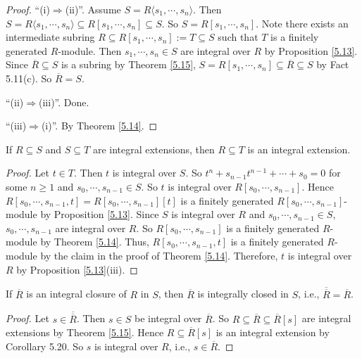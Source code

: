 \begin{proof}
    ``(i)$\Rightarrow$(ii)''. Assume $S = R\langle s_1,\cdots,s_n \rangle$. Then $S = R\langle s_1,\cdots,s_n \rangle \subseteq R[s_1,\cdots,s_n] \subseteq S$. So $S = R[s_1,\cdots,s_n]$. Note there exists an intermediate subring $R \subseteq R[s_1,\cdots,s_n] := T \subseteq S$ such that $T$ is a finitely generated $R$-module. Then $s_1,\cdots,s_n \in S$ are integral over $R$ by Proposition \ref{5.13}. Since $\overbar{R} \subseteq S$ is a subring by Theorem \ref{5.15}, $S = R[s_1,\cdots,s_n] \subseteq \overbar{R} \subseteq S$ by Fact 5.11(c). So $\overbar{R} = S$. \par
    ``(ii)$\Rightarrow$(iii)''. Done. \par 
    ``(iii)$\Rightarrow$(i)''. By Theorem \ref{5.14}.
\end{proof}


\begin{corollary}\label{5.20}
    If $R \subseteq S$ and $S \subseteq T$ are integral extensions, then $R \subseteq T$ is an integral extension.
\end{corollary}

\begin{proof}
    Let $t \in T$. Then $t$ is integral over $S$. So $t^n + s_{n-1} t^{n-1} + \cdots + s_0 = 0$ for some $n \geq 1$ and $s_0,\cdots,s_{n-1} \in S$. So $t$ is integral over $R[s_0,\cdots,s_{n-1}]$. Hence $R[s_0,\cdots,s_{n-1},t] = R[s_0,\cdots,s_{n-1}][t]$ is a finitely generated $R[s_0,\cdots,s_{n-1}]$-module by Proposition \ref{5.13}. Since $S$ is integral over $R$ and $s_0,\cdots,s_{n-1} \in S$, $s_0,\cdots,s_{n-1}$ are integral over $R$. So $R[s_0,\cdots,s_{n-1}]$ is a finitely generated $R$-module by Theorem \ref{5.14}. Thus, $R[s_0,\cdots,s_{n-1},t]$ is a finitely generated $R$-module by the claim in the proof of Theorem \ref{5.14}. Therefore, $t$ is integral over $R$ by Proposition \ref{5.13}(iii).
\end{proof}

\begin{corollary}\label{5.21}
    If $\overbar{R}$ is an integral closure of $R$ in $S$, then $\overbar{R}$ is integrally closed in $S$, i.e., ${\overbar{\overbar{R}}} = \overbar{R}$.
\end{corollary}

\begin{proof}
    Let $s \in \overbar{\overbar{R}}$. Then $s \in S$ be integral over $\overbar{R}$. So $R \subseteq \overbar{R} \subseteq \overbar{R}[s]$ are integral extensions by Theorem \ref{5.15}. Hence $R \subseteq \overbar{R}[s]$ is an integral extension by Corollary 5.20. So $s$ is integral over $R$, i.e., $s \in \overbar{R}$.
\end{proof}

